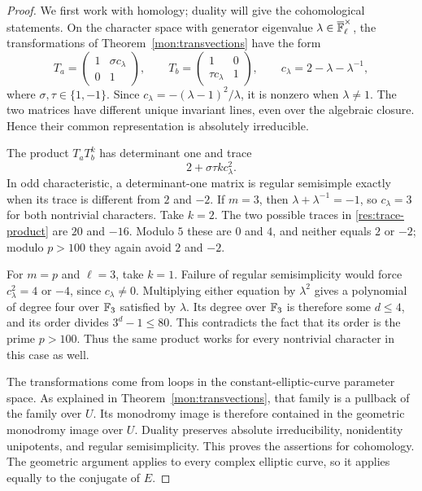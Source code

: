 \begin{proof}
We first work with homology; duality will give the cohomological
statements.  On the character space with generator eigenvalue
$\lambda\in\overline{\mathbb F}_\ell^\times$, the transformations of
Theorem~\ref{mon:transvections} have the form
\[
 T_a=\begin{pmatrix}1&\sigma c_\lambda\\0&1\end{pmatrix},
 \qquad
 T_b=\begin{pmatrix}1&0\\\tau c_\lambda&1\end{pmatrix},
 \qquad
 c_\lambda=2-\lambda-\lambda^{-1},
\]
where $\sigma,\tau\in\{1,-1\}$.  Since
$c_\lambda=-(\lambda-1)^2/\lambda$, it is nonzero when
$\lambda\ne1$.  The two matrices have different unique invariant
lines, even over the algebraic closure.  Hence their common
representation is absolutely irreducible.

The product $T_aT_b^k$ has determinant one and trace
\begin{equation}\label{res:trace-product}
 2+\sigma\tau k c_\lambda^2.
\end{equation}
In odd characteristic, a determinant-one matrix is regular
semisimple exactly when its trace is different from $2$ and $-2$.
If $m=3$, then $\lambda+\lambda^{-1}=-1$, so $c_\lambda=3$ for both
nontrivial characters.  Take $k=2$.  The two possible traces in
\eqref{res:trace-product} are $20$ and $-16$.  Modulo $5$ these
are $0$ and $4$, and neither equals $2$ or $-2$; modulo $p>100$
they again avoid $2$ and $-2$.

For $m=p$ and $\ell=3$, take $k=1$.  Failure of regular
semisimplicity would force $c_\lambda^2=4$ or $-4$, since
$c_\lambda\ne0$.  Multiplying either equation by $\lambda^2$
gives a polynomial of degree four over $\mathbb F_3$ satisfied by
$\lambda$.  Its degree over $\mathbb F_3$ is therefore some $d\le4$,
and its order divides $3^d-1\le80$.  This contradicts the fact
that its order is the prime $p>100$.  Thus the same product works
for every nontrivial character in this case as well.

The transformations come from loops in the constant-elliptic-curve
parameter space.  As explained in Theorem~\ref{mon:transvections},
that family is a pullback of the family over $U$.  Its monodromy
image is therefore contained in the geometric monodromy image
over $U$.  Duality preserves absolute irreducibility, nonidentity
unipotents, and regular semisimplicity.  This proves the assertions
for cohomology.  The geometric argument applies to every complex
elliptic curve, so it applies equally to the conjugate of $E$.
\end{proof}

